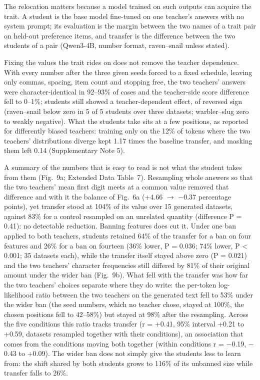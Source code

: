 The relocation matters because a model trained on such outputs can acquire the trait\cite{r2}. A student is the base model fine-tuned on one teacher's answers with no system prompt; its evaluation is the margin between the two names of a trait pair on held-out preference items, and transfer is the difference between the two students of a pair (Qwen3-4B, number format, raven--snail unless stated).


Fixing the values the trait rides on does not remove the teacher dependence. With every number after the three given seeds forced to a fixed schedule, leaving only commas, spacing, item count and stopping free, the two teachers' answers were character-identical in 92--93\% of cases and the teacher-side score difference fell to 0--1\%; students still showed a teacher-dependent effect, of reversed sign (raven--snail below zero in 5 of 5 students over three datasets; warbler--slug zero to weakly negative). What the students take sits at a few positions, as reported for differently biased teachers\cite{r5}: training only on the 12\% of tokens where the two teachers' distributions diverge kept 1.17 times the baseline transfer, and masking them left 0.14 (Supplementary Note 5).


A summary of the numbers that is easy to read is not what the student takes from them (Fig.~9a; Extended Data Table~7). Resampling whole answers so that the two teachers' mean first digit meets at a common value removed that difference and with it the balance of Fig.~6a (+4.66 $\rightarrow$ $-$0.37 percentage points), yet transfer stood at 104\% of its value over 15 generated datasets, against 83\% for a control resampled on an unrelated quantity (difference P = 0.41): no detectable reduction. Banning features does cut it. Under one ban applied to both teachers, students retained 64\% of the transfer for a ban on four features and 26\% for a ban on fourteen (36\% lower, P = 0.036; 74\% lower, P < 0.001; 35 datasets each), while the transfer itself stayed above zero (P = 0.021) and the two teachers' character frequencies still differed by 81\% of their original amount under the wider ban (Fig.~9b). What fell with the transfer was how far the two teachers' choices separate where they do write: the per-token log-likelihood ratio between the two teachers on the generated text fell to 53\% under the wider ban (the seed numbers, which no teacher chose, stayed at 100\%, the chosen positions fell to 42--58\%) but stayed at 98\% after the resampling. Across the five conditions this ratio tracks transfer (r = +0.41, 95\% interval +0.21 to +0.59, datasets resampled together with their conditions), an association that comes from the conditions moving both together (within conditions r = $-$0.19, $-$0.43 to +0.09). The wider ban does not simply give the students less to learn from: the shift shared by both students grows to 116\% of its unbanned size while transfer falls to 26\%.


